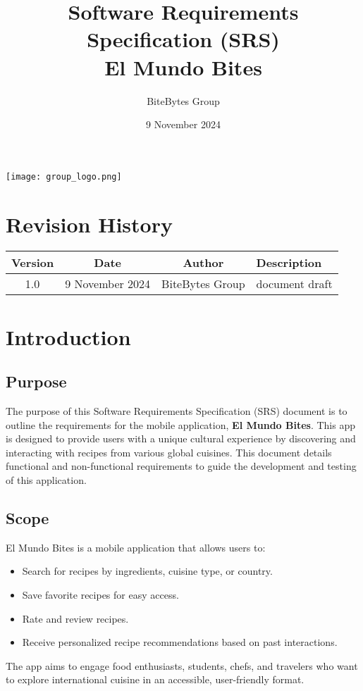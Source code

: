 \documentclass[12pt]{article}
\title{Software Requirements Specification (SRS) \\ \textbf{El Mundo Bites}}
\author{BiteBytes Group}
\date{9 November 2024}
\begin{document}
\maketitle

\thispagestyle{empty}
\vspace{2cm}

\begin{center}
    \texttt{[image: group\_logo.png]} %
\end{center}

\newpage
{}
\tableofcontents
\newpage

\section*{Revision History}
\begin{longtable}{|c|c|c|l|}
\hline
\textbf{Version} & \textbf{Date}       & \textbf{Author}  & \textbf{Description} \\ \hline
1.0              & 9 November 2024 & BiteBytes Group & document draft \\ \hline
\end{longtable}

\newpage
{}

\section{Introduction}

\subsection{Purpose}
The purpose of this Software Requirements Specification (SRS) document is to outline the requirements for the mobile application, \textbf{El Mundo Bites}. This app is designed to provide users with a unique cultural experience by discovering and interacting with recipes from various global cuisines. This document details functional and non-functional requirements to guide the development and testing of this application.

\subsection{Scope}
El Mundo Bites is a mobile application that allows users to:
\begin{itemize}
    \item Search for recipes by ingredients, cuisine type, or country.
    \item Save favorite recipes for easy access.
    \item Rate and review recipes.
    \item Receive personalized recipe recommendations based on past interactions.
\end{itemize}
The app aims to engage food enthusiasts, students, chefs, and travelers who want to explore international cuisine in an accessible, user-friendly format.
\end{document}
